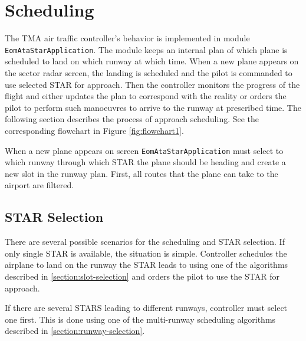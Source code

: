\section{Scheduling}

The TMA air traffic controller's behavior is implemented in module \texttt{EomAtaStarApplication}. The module keeps an internal plan of which plane is scheduled to land on which runway at which time. When a new plane appears on the sector radar screen, the landing is scheduled and the pilot is commanded to use selected STAR for approach. Then the controller monitors the progress of the flight and either updates the plan to correspond with the reality or orders the pilot to perform such manoeuvres to arrive to the runway at prescribed time. The following section describes the process of approach scheduling. See the corresponding flowchart in Figure \ref{fig:flowchart1}.

When a new plane appears on screen \texttt{EomAtaStarApplication} must select to which runway through which STAR the plane should be heading and create a new slot in the runway plan. First, all routes that the plane can take to the airport are filtered.

\subsection{STAR Selection}

There are several possible scenarios for the scheduling and STAR selection. If only single STAR is available, the situation is simple. Controller schedules the airplane to land on the runway the STAR leads to using one of the algorithms described in \ref{section:slot-selection} and orders the pilot to use the STAR for approach.

If there are several STARS leading to different runways, controller must select one first. This is done using one of the multi-runway scheduling algorithms described in \ref{section:runway-selection}.


\providecommand{\cmark}[2][]{\relax}
\providecommand{\cmark}[2][]{
  \begin{pgfonlayer}{marx}
    \node [nmark] at (c#2#1) {#2};
  \end{pgfonlayer}{marx}
  } 


